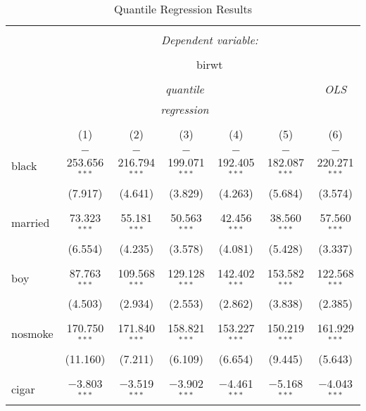 
\begin{table}[!htbp] \centering 
  \caption{Quantile Regression Results} 
  \label{tab:} 
\begin{tabular}{@{\extracolsep{5pt}}lcccccc} 
\\[-1.8ex]\hline 
\hline \\[-1.8ex] 
 & \multicolumn{6}{c}{\textit{Dependent variable:}} \\ 
\cline{2-7} 
\\[-1.8ex] & \multicolumn{6}{c}{birwt} \\ 
\\[-1.8ex] & \multicolumn{5}{c}{\textit{quantile}} & \textit{OLS} \\ 
 & \multicolumn{5}{c}{\textit{regression}} & \textit{} \\ 
\\[-1.8ex] & (1) & (2) & (3) & (4) & (5) & (6)\\ 
\hline \\[-1.8ex] 
 black & $-$253.656$^{***}$ & $-$216.794$^{***}$ & $-$199.071$^{***}$ & $-$192.405$^{***}$ & $-$182.087$^{***}$ & $-$220.271$^{***}$ \\ 
  & (7.917) & (4.641) & (3.829) & (4.263) & (5.684) & (3.574) \\ 
  & & & & & & \\ 
 married & 73.323$^{***}$ & 55.181$^{***}$ & 50.563$^{***}$ & 42.456$^{***}$ & 38.560$^{***}$ & 57.560$^{***}$ \\ 
  & (6.554) & (4.235) & (3.578) & (4.081) & (5.428) & (3.337) \\ 
  & & & & & & \\ 
 boy & 87.763$^{***}$ & 109.568$^{***}$ & 129.128$^{***}$ & 142.402$^{***}$ & 153.582$^{***}$ & 122.568$^{***}$ \\ 
  & (4.503) & (2.934) & (2.553) & (2.862) & (3.838) & (2.385) \\ 
  & & & & & & \\ 
 nosmoke & 170.750$^{***}$ & 171.840$^{***}$ & 158.821$^{***}$ & 153.227$^{***}$ & 150.219$^{***}$ & 161.929$^{***}$ \\ 
  & (11.160) & (7.211) & (6.109) & (6.654) & (9.445) & (5.643) \\ 
  & & & & & & \\ 
 cigar & $-$3.803$^{***}$ & $-$3.519$^{***}$ & $-$3.902$^{***}$ & $-$4.461$^{***}$ & $-$5.168$^{***}$ & $-$4.043$^{***}$ \\ 

\end{tabular}
\end{table}
